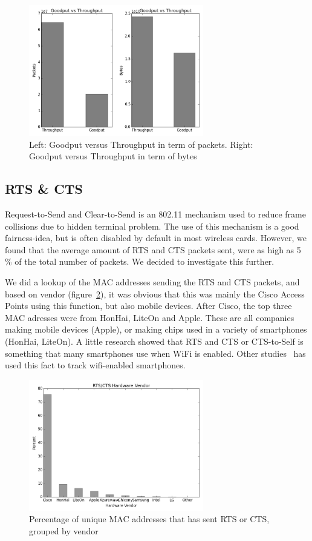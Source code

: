 \documentclass[letterpaper,twocolumn,10pt]{article}
\begin{document}
\begin{figure}[!htb] 
\begin{center} 
\includegraphics[width=3in]{goodput_combined.png} 
\caption{Left: Goodput versus Throughput in term of packets. Right: Goodput versus Throughput in term of bytes} 
\label{fig:goodput_combined} 
\end{center} 
\end{figure}

\subsection{RTS \& CTS}

Request-to-Send and Clear-to-Send is an 802.11 mechanism used to reduce frame collisions due to hidden terminal problem. The use of this mechanism is a good fairness-idea, but is often disabled by default in most wireless cards. However, we found that the average amount of RTS and CTS packets sent, were as high as 5 \% of the total number of packets. We decided to investigate this further.

We did a lookup of the MAC addresses sending the RTS and CTS packets, and based on vendor (figure~\ref{fig:rtscts_vendor}), it was obvious that this was mainly the Cisco Access Points using this function, but also mobile devices. After Cisco, the top three MAC adresses were from HonHai, LiteOn and Apple. These are all companies making mobile devices (Apple), or making chips used in a variety of smartphones (HonHai, LiteOn). A little research showed that RTS and CTS or CTS-to-Self is something that many smartphones use when WiFi is enabled. Other studies~\cite{Smartphones} has used this fact to track wifi-enabled smartphones.

\begin{figure}[!htb] 
\begin{center} 
\includegraphics[width=3in]{rtscts_vendor.png} 
\caption{Percentage of unique MAC addresses that has sent RTS or CTS, grouped by vendor} 
\label{fig:rtscts_vendor} 
\end{center} 
\end{figure}
\end{document}

